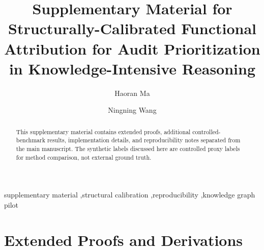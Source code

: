 \documentclass[a4paper,fleqn]{cas-sc}
\begin{document}
\let\WriteBookmarks\relax
\def\floatpagepagefraction{1}
\def\textpagefraction{.001}


\title[mode=title]{Supplementary Material for Structurally-Calibrated Functional Attribution for Audit Prioritization in Knowledge-Intensive Reasoning}

\author[1]{Haoran Ma}

\author[1,2]{Ningning Wang}




\begin{abstract}
This supplementary material contains extended proofs, additional controlled-benchmark results, implementation details, and reproducibility notes separated from the main manuscript. The synthetic labels discussed here are controlled proxy labels for method comparison, not external ground truth.
\end{abstract}

\begin{keywords}
supplementary material \sep structural calibration \sep reproducibility \sep knowledge graph pilot
\end{keywords}

\maketitle

\appendix
\makeatletter
\renewcommand{\thetable}{\@Alph\c@section.\arabic{table}}
\renewcommand{\thefigure}{\@Alph\c@section.\arabic{figure}}
\renewcommand{\thealgorithm}{\@Alph\c@section.\arabic{algorithm}}
\renewcommand{\theequation}{\@Alph\c@section.\arabic{equation}}
\makeatother

\section{Extended Proofs and Derivations}
\label{app:proofs}
\end{document}
